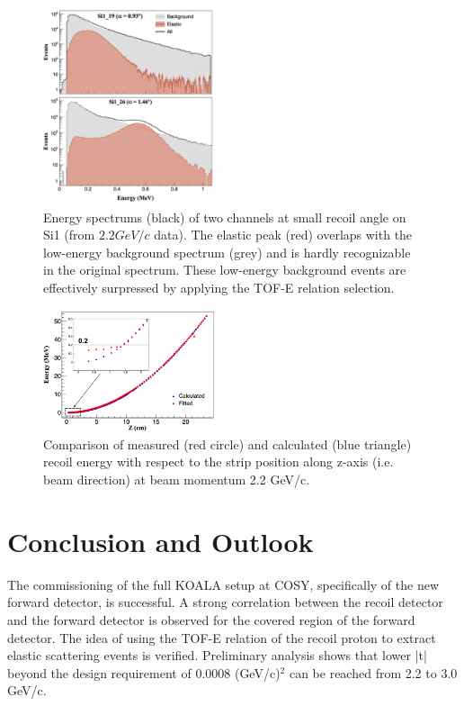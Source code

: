 \documentclass[number,5p]{elsarticle}
\begin{document}
\begin{figure}[h!]
  \centering
  \includegraphics[width=0.45\textwidth]{./comparison_tof_e_cut_2.2_log_angle.png}
  \caption{Energy spectrums (black) of two channels at small recoil angle on Si1 (from
    $2.2 GeV/c$ data). The elastic peak (red) overlaps with the low-energy background
    spectrum (grey) and is hardly recognizable in the original spectrum. These low-energy background events are effectively surpressed by applying the TOF-E relation selection.}
  \label{fig:cut}
\end{figure}


\begin{figure}[h!]
  \centering
  \includegraphics[width=0.45\textwidth]{./calc_vs_measured_2.2_combined.png}
  \caption{
    Comparison of measured (red circle) and calculated (blue triangle) recoil energy with respect to the strip position along z-axis (i.e. beam direction) at beam momentum 2.2 GeV/c.}
  \label{fig:measured_vs_calculated}
\end{figure}


\section{Conclusion and Outlook}
\label{sec:conclusion}

The commissioning of the full KOALA setup at COSY, specifically of the new forward detector, is successful.
A strong correlation between the recoil detector and the forward detector is
observed for the covered region of the forward detector.
The idea of using the TOF-E relation of the recoil proton to extract elastic
scattering events is verified.
Preliminary analysis shows that lower |t| beyond the design requirement of 0.0008 (GeV/c)$^2$ can be reached from 2.2 to 3.0 GeV/c. 
\end{document}
